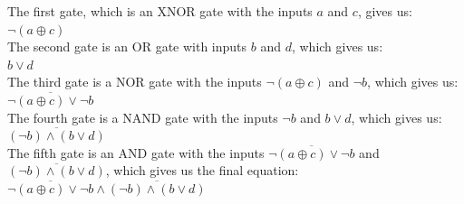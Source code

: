 \documentclass{article}
\begin{document}
\customdate{\today}

 {
     The first gate, which is an XNOR gate with the inputs \(a\) and \(c\), gives us: \\
     \(\neg(a \oplus c)\) \\
     \linebreak
     The second gate is an OR gate with inputs \(b\) and \(d\), which gives us: \\
     \(b \lor d\) \\
     \linebreak
     The third gate is a NOR gate with the inputs \(\neg(a \oplus c)\) and \(\neg b\), which gives us: \\
     \(\overline{\neg(a \oplus c) \lor \neg b}\) \\
     \linebreak
     The fourth gate is a NAND gate with the inputs \(\neg b\) and \(b \lor d\), which gives us: \\
     \(\overline{(\neg b) \land (b \lor d)}\) \\
     \linebreak
     The fifth gate is an AND gate with the inputs \(\overline{\neg(a \oplus c) \lor \neg b}\) and \(\overline{(\neg b) \land (b \lor d)}\), which gives us the final equation: \\
     \(\overline{\neg(a \oplus c) \lor \neg b} \land \overline{(\neg b) \land (b \lor d)}\)
}
\end{document}
